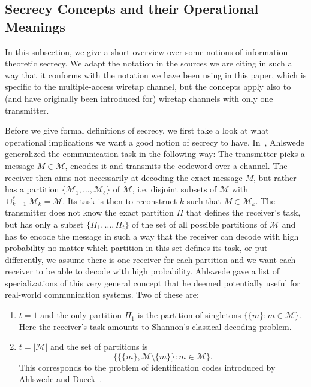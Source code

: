 \documentclass[journal]{IEEEtran}
\newcommand{\cardinality}[1]{\lvert #1 \rvert}
\newcommand{\messageRV}{M}
\newcommand{\messageAlphabet}{\mathcal{M}}
\newcommand{\nPartitions}{t}
\newcommand{\nPartitionElements}{\ell}
\newcommand{\indexPartitions}{k}
\newcommand{\messageAlphabetElement}{m}
\newcommand{\partition}{{\Pi}}
\begin{document}
\subsection{Secrecy Concepts and their Operational Meanings}
\label{sec:secrecy-concepts}
In this subsection, we give a short overview over some notions of information-theoretic secrecy. We adapt the notation in the sources we are citing in such a way that it conforms with the notation we have been using in this paper, which is specific to the multiple-access wiretap channel, but the concepts apply also to (and have originally been introduced for) wiretap channels with only one transmitter.

Before we give formal definitions of secrecy, we first take a look at what operational implications we want a good notion of secrecy to have. In~\cite{AhlswedeGeneral}, Ahlswede generalized the communication task in the following way: The transmitter picks a message $\messageRV \in \messageAlphabet$, encodes it and transmits the codeword over a channel. The receiver then aims not necessarily at decoding the exact message $\messageRV$, but rather has a partition $\{\messageAlphabet_1, \dots, \messageAlphabet_\nPartitionElements\}$ of $\messageAlphabet$, i.e. disjoint subsets of $\messageAlphabet$ with $\cup_{\indexPartitions = 1}^{\nPartitionElements} \messageAlphabet_\indexPartitions = \messageAlphabet$. Its task is then to reconstruct $\indexPartitions$ such that $\messageRV \in \messageAlphabet_\indexPartitions$. The transmitter does not know the exact partition $\partition$ that defines the receiver's task, but has only a subset $\{\partition_1, \dots, \partition_\nPartitions\}$ of the set of all possible partitions of $\messageAlphabet$ and has to encode the message in such a way that the receiver can decode with high probability no matter which partition in this set defines its task, or put differently, we assume there is one receiver for each partition and we want each receiver to be able to decode with high probability. Ahlswede gave a list of specializations of this very general concept that he deemed potentially useful for real-world communication systems. Two of these are:
\begin{enumerate}
 \item $\nPartitions = 1$ and the only partition $\partition_1$ is the partition of singletons $\{\{\messageAlphabetElement\}: \messageAlphabetElement \in \messageAlphabet\}$. Here the receiver's task amounts to Shannon's classical decoding problem.\label{ahlswede-classification-shannon}
 \item $\nPartitions = \cardinality{\messageAlphabet}$ and the set of partitions is
 \[\Big\{\big\{\{\messageAlphabetElement\}, \messageAlphabet \setminus \{\messageAlphabetElement\}\big\}: \messageAlphabetElement \in \messageAlphabet\Big\}.\]
 This corresponds to the problem of identification codes introduced by Ahlswede and Dueck~\cite{AhlswedeDueckIdentification}.\label{ahlswede-classification-identification}
\end{enumerate}
\end{document}
